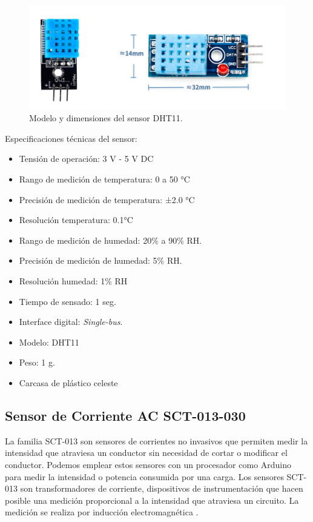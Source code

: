 \begin{figure}[htbp]
	\centering
	\includegraphics[width=.7\textwidth]{./Figures/dht11.jpg}
	\caption{Modelo y dimensiones del sensor DHT11. }

	\label{fig:dht11}
\end{figure}

Especificaciones técnicas del sensor:

\begin{itemize}
\item Tensión de operación: 3 V - 5 V DC
\item Rango de medición de temperatura: 0 a 50 °C
\item Precisión de medición de temperatura: ±2.0 °C
\item Resolución temperatura: 0.1°C
\item Rango de medición de humedad: 20\% a 90\% RH.
\item Precisión de medición de humedad: 5\% RH.
\item Resolución humedad: 1\% RH
\item Tiempo de sensado: 1 seg.
\item Interface digital: \emph{Single-bus}.
\item Modelo: DHT11
\item Peso: 1 g.
\item Carcasa de plástico celeste
\end{itemize}

\subsection{Sensor de Corriente AC SCT-013-030}

La familia SCT-013 son sensores de corrientes no invasivos que permiten medir la intensidad que atraviesa un conductor sin necesidad de cortar o modificar el conductor. Podemos emplear estos sensores con un procesador como Arduino para medir la intensidad o potencia consumida por una carga. Los sensores SCT-013 son transformadores de corriente, dispositivos de instrumentación que hacen posible una medición proporcional a la intensidad que atraviesa un circuito. La medición se realiza por inducción electromagnética \citep{WEBSITE:9}. 

